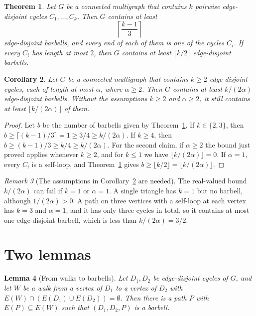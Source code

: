 \documentclass[11pt,a4paper]{article}
\newtheorem{theorem}{Theorem}
\newtheorem{lemma}[theorem]{Lemma}
\newtheorem{corollary}[theorem]{Corollary}
\theoremstyle{definition}
\theoremstyle{remark}
\newtheorem{remark}[theorem]{Remark}
\begin{document}
\begin{theorem}\label{thm:main}
Let \(G\) be a connected multigraph that contains \(k\) pairwise edge-disjoint
cycles \(C_1,\dots,C_k\). Then \(G\) contains at least
\[
  \left\lceil\frac{k-1}{3}\right\rceil
\]
edge-disjoint barbells, and every end of each of them is one of the cycles
\(C_i\). If every \(C_i\) has length at most \(2\), then \(G\) contains at least
\(\lfloor k/2\rfloor\) edge-disjoint barbells.
\end{theorem}

\begin{corollary}\label{cor:alpha}
Let \(G\) be a connected multigraph that contains \(k\ge2\) edge-disjoint
cycles, each of length at most \(\alpha\), where \(\alpha\ge2\). Then \(G\)
contains at least \(k/(2\alpha)\) edge-disjoint barbells. Without the
assumptions \(k\ge2\) and \(\alpha\ge2\), it still contains at least
\(\lfloor k/(2\alpha)\rfloor\) of them.
\end{corollary}

\begin{proof}
Let \(b\) be the number of barbells given by Theorem~\ref{thm:main}. If
\(k\in\{2,3\}\), then \(b\ge\lceil(k-1)/3\rceil=1\ge3/4\ge k/(2\alpha)\). If
\(k\ge4\), then \(b\ge(k-1)/3\ge k/4\ge k/(2\alpha)\). For the second claim,
if \(\alpha\ge2\) the bound just proved applies whenever \(k\ge2\), and for
\(k\le1\) we have \(\lfloor k/(2\alpha)\rfloor=0\). If \(\alpha=1\), every
\(C_i\) is a self-loop, and Theorem~\ref{thm:main} gives
\(b\ge\lfloor k/2\rfloor=\lfloor k/(2\alpha)\rfloor\).
\end{proof}

\begin{remark}[The assumptions in Corollary~\ref{cor:alpha} are needed]
\label{rem:assumptions}
The real-valued bound \(k/(2\alpha)\) can fail if \(k=1\) or \(\alpha=1\). A
single triangle has \(k=1\) but no barbell, although \(1/(2\alpha)>0\). A path
on three vertices with a self-loop at each vertex has \(k=3\) and
\(\alpha=1\), and it has only three cycles in total, so it contains at most one
edge-disjoint barbell, which is less than \(k/(2\alpha)=3/2\).
\end{remark}

\section{Two lemmas}

\begin{lemma}[From walks to barbells]\label{lem:walk}
Let \(D_1,D_2\) be edge-disjoint cycles of \(G\), and let \(W\) be a walk from a
vertex of \(D_1\) to a vertex of \(D_2\) with
\(E(W)\cap(E(D_1)\cup E(D_2))=\emptyset\). Then there is a path \(P\) with
\(E(P)\subseteq E(W)\) such that \((D_1,D_2,P)\) is a barbell.
\end{lemma}
\end{document}
